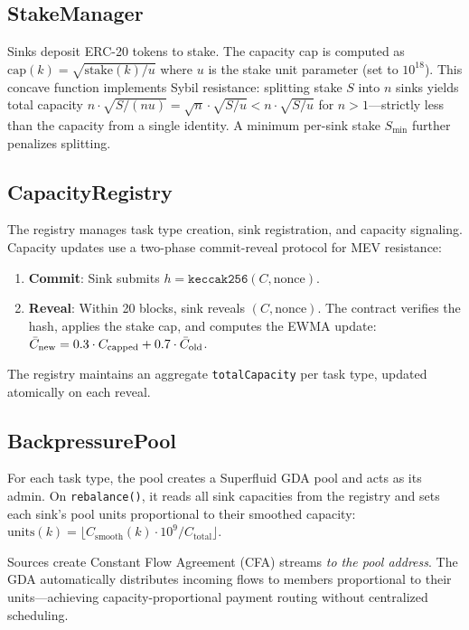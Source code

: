\subsection{StakeManager}

Sinks deposit ERC-20 tokens to stake. The capacity cap is computed as
$\text{cap}(k) = \sqrt{\text{stake}(k) / u}$ where $u$ is the stake unit
parameter (set to $10^{18}$). This concave function implements Sybil resistance:
splitting stake $S$ into $n$ sinks yields total capacity
$n \cdot \sqrt{S/(nu)} = \sqrt{n} \cdot \sqrt{S/u} < n \cdot \sqrt{S/u}$
for $n > 1$---strictly less than the capacity from a single identity.
A minimum per-sink stake $S_{\min}$ further penalizes splitting.

\subsection{CapacityRegistry}

The registry manages task type creation, sink registration, and capacity
signaling. Capacity updates use a two-phase commit-reveal protocol for
MEV resistance:

\begin{enumerate}
  \item \textbf{Commit}: Sink submits $h = \texttt{keccak256}(C, \text{nonce})$.
  \item \textbf{Reveal}: Within 20 blocks, sink reveals $(C, \text{nonce})$.
        The contract verifies the hash, applies the stake cap, and computes
        the EWMA update: $\bar{C}_{\text{new}} = 0.3 \cdot C_{\text{capped}}
        + 0.7 \cdot \bar{C}_{\text{old}}$.
\end{enumerate}

The registry maintains an aggregate \texttt{totalCapacity} per task type,
updated atomically on each reveal.

\subsection{BackpressurePool}

For each task type, the pool creates a Superfluid GDA pool and acts as its
admin. On \texttt{rebalance()}, it reads all sink capacities from the registry
and sets each sink's pool units proportional to their smoothed capacity:
$\text{units}(k) = \lfloor C_{\text{smooth}}(k) \cdot 10^9 / C_{\text{total}} \rfloor$.

Sources create Constant Flow Agreement (CFA) streams \emph{to the pool address}.
The GDA automatically distributes incoming flows to members proportional to their
units---achieving capacity-proportional payment routing without centralized scheduling.

